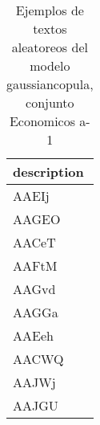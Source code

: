 \begin{table}[H]
\centering
\fontsize{8}{14}\selectfont
\caption{Ejemplos de textos aleatoreos del modelo gaussiancopula, conjunto Economicos a-1}
\label{table-sample10-economicos-a-1-gaussiancopula-text}
\begin{tabular}{|m{50em}|}
\hline
\rowcolor[gray]{0.8}
description \\
\hline AAEIj \\
\hline AAGEO \\
\hline AACeT \\
\hline AAFtM \\
\hline AAGvd \\
\hline AAGGa \\
\hline AAEeh \\
\hline AACWQ \\
\hline AAJWj \\
\hline AAJGU \\
\hline
\end{tabular}
\end{table}
